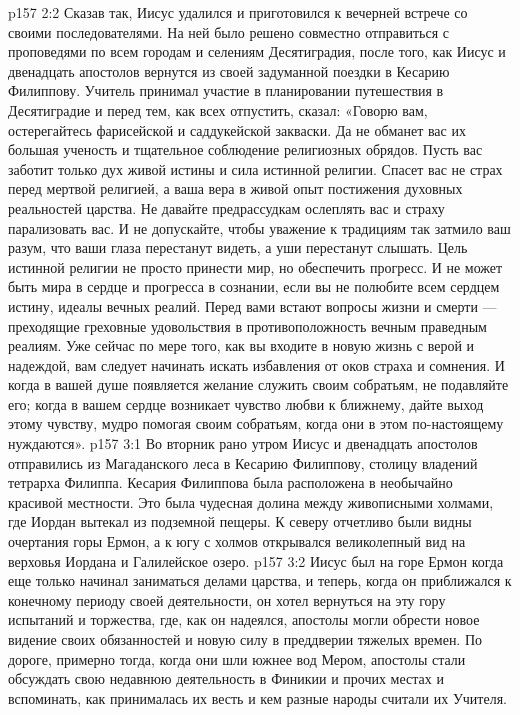 \vs p157 2:2 \pc Сказав так, Иисус удалился и приготовился к вечерней встрече со своими последователями. На ней было решено совместно отправиться с проповедями по всем городам и селениям Десятиградия, после того, как Иисус и двенадцать апостолов вернутся из своей задуманной поездки в Кесарию Филиппову. Учитель принимал участие в планировании путешествия в Десятиградие и перед тем, как всех отпустить, сказал: «Говорю вам, остерегайтесь фарисейской и саддукейской закваски. Да не обманет вас их большая ученость и тщательное соблюдение религиозных обрядов. Пусть вас заботит только дух живой истины и сила истинной религии. Спасет вас не страх перед мертвой религией, а ваша вера в живой опыт постижения духовных реальностей царства. Не давайте предрассудкам ослеплять вас и страху парализовать вас. И не допускайте, чтобы уважение к традициям так затмило ваш разум, что ваши глаза перестанут видеть, а уши перестанут слышать. Цель истинной религии не просто принести мир, но обеспечить прогресс. И не может быть мира в сердце и прогресса в сознании, если вы не полюбите всем сердцем истину, идеалы вечных реалий. Перед вами встают вопросы жизни и смерти --- преходящие греховные удовольствия в противоположность вечным праведным реалиям. Уже сейчас по мере того, как вы входите в новую жизнь с верой и надеждой, вам следует начинать искать избавления от оков страха и сомнения. И когда в вашей душе появляется желание служить своим собратьям, не подавляйте его; когда в вашем сердце возникает чувство любви к ближнему, дайте выход этому чувству, мудро помогая своим собратьям, когда они в этом по\hyp{}настоящему нуждаются».
\vs p157 3:1 Во вторник рано утром Иисус и двенадцать апостолов отправились из Магаданского леса в Кесарию Филиппову, столицу владений тетрарха Филиппа. Кесария Филиппова была расположена в необычайно красивой местности. Это была чудесная долина между живописными холмами, где Иордан вытекал из подземной пещеры. К северу отчетливо были видны очертания горы Ермон, а к югу с холмов открывался великолепный вид на верховья Иордана и Галилейское озеро.
\vs p157 3:2 Иисус был на горе Ермон когда еще только начинал заниматься делами царства, и теперь, когда он приближался к конечному периоду своей деятельности, он хотел вернуться на эту гору испытаний и торжества, где, как он надеялся, апостолы могли обрести новое видение своих обязанностей и новую силу в преддверии тяжелых времен. По дороге, примерно тогда, когда они шли южнее вод Мером, апостолы стали обсуждать свою недавнюю деятельность в Финикии и прочих местах и вспоминать, как принималась их весть и кем разные народы считали их Учителя.
